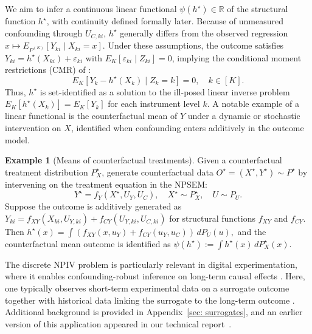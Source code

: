 \documentclass[11pt]{article}
\theoremstyle{plain}
\theoremstyle{definition}
\newtheorem{example}{Example}
\theoremstyle{remark}
\theoremstyle{definition}
\begin{document}
We aim to infer a continuous linear functional \( \psi(h^\star) \in \mathbb{R} \) of the structural function \(h^\star\), with continuity defined formally later. Because of unmeasured confounding through \(U_{C,ki}\), \(h^\star\) generally differs from the observed regression \(x \mapsto E_{P^{(K)}}[Y_{ki} \mid X_{ki} = x]\). Under these assumptions, the outcome satisfies
\(Y_{ki} = h^\star(X_{ki}) + \varepsilon_{ki}\)
with \(E_K[\varepsilon_{ki} \mid Z_{ki}] = 0\),
implying the conditional moment restrictions (CMR) of \citet{newey2003instrumental, ai2003efficient}:
\begin{equation}
E_K[Y_k - h^\star(X_k) \mid Z_k = k] = 0, \quad k \in [K].
\end{equation}
Thus, \(h^\star\) is set-identified as a solution to the ill-posed linear inverse problem \(E_K[h^\star(X_k)] = E_K[Y_k]\) for each instrument level \(k\). A notable example of a linear functional is the counterfactual mean of \(Y\) under a dynamic or stochastic intervention on \(X\), identified when confounding enters additively in the outcome model.

\setcounter{example}{0}
\begin{example}[Means of counterfactual treatments]
Given a counterfactual treatment distribution \(P_X^\star\), generate counterfactual data \(O^\star = (X^\star, Y^\star) \sim P^{\star}\) by intervening on the treatment equation in the NPSEM:
\[
Y^\star = f_Y(X^\star, U_Y, U_C), \quad X^\star \sim P_X^\star, \quad U \sim P_U.
\]
Suppose the outcome is additively generated as 
\(Y_{ki} = f_{XY}(X_{ki}, U_{Y,ki}) + f_{CY}(U_{Y,ki}, U_{C,ki})\)
for structural functions \(f_{XY}\) and \(f_{CY}\). Then $h^\star(x) = \int \!\left(f_{XY}(x, u_Y) + f_{CY}(u_Y, u_C)\right)\, dP_U(u),$
and the counterfactual mean outcome is identified as 
\(\psi(h^\star) := \int h^\star(x)\, dP_X^\star(x)\).
\end{example}

The discrete NPIV problem is particularly relevant in digital experimentation, where it enables confounding-robust inference on long-term causal effects \citep{peysakhovich2018learning, bibaut2024nonparametric}. Here, one typically observes short-term experimental data on a surrogate outcome together with historical data linking the surrogate to the long-term outcome \citep{athey2019surrogate}. Additional background is provided in Appendix~\ref{sec: surrogates}, and an earlier version of this application appeared in our technical report~\citep{bibaut2024nonparametric}.
\end{document}
